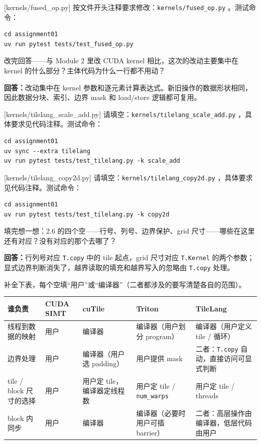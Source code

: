 \documentclass[11pt,a4paper,fontset=windows]{ctexart}
\begin{document}
[kernels/fused\_op.py]
按文件开头注释要求修改：\texttt{kernels/fused\_op.py} 。测试命令：

\begin{lstlisting}
cd assignment01
uv run pytest tests/test_fused_op.py
\end{lstlisting}

改完回答——与 Module 2 里改 CUDA kernel 相比，这次的改动主要集中在 kernel 的什么部分？主体代码为什么一行都不用动？

\par\textbf{回答：}改动集中在 kernel 参数和逐元素计算表达式。新旧操作的数据形状相同，因此数据分块、索引、边界 mask 和 load/store 逻辑都可复用。

[kernels/tilelang\_scale\_add.py]
请填空：\texttt{kernels/tilelang\_scale\_add.py} ，具体要求见代码注释。测试命令：

\begin{lstlisting}
cd assignment01
uv sync --extra tilelang
uv run pytest tests/test_tilelang.py -k scale_add
\end{lstlisting}

[kernels/tilelang\_copy2d.py]
请填空：\texttt{kernels/tilelang\_copy2d.py} ，具体要求见代码注释。测试命令：

\begin{lstlisting}
cd assignment01
uv run pytest tests/test_tilelang.py -k copy2d
\end{lstlisting}

填完想一想：2.6 的四个空——行号、列号、边界保护、grid 尺寸——哪些在这里还有对应？没有对应的那个去哪了？

\par\textbf{回答：}行列号对应 \texttt{T.copy} 中的 tile 起点，grid 尺寸对应 \texttt{T.Kernel} 的两个参数；显式边界判断消失了，越界读取的填充和越界写入的忽略由 \texttt{T.copy} 处理。

补全下表，每个空填“用户”或“编译器”（二者都涉及的要写清楚各自的范围）。

\begin{center}\small
\begin{tabular}{@{}lp{6em}p{8em}p{8em}p{9em}@{}}
\toprule
谁负责 & CUDA SIMT & cuTile & Triton & TileLang \\
\midrule
线程到数据的映射 & 用户 & 编译器 & 编译器（用户划分 program） & 编译器（用户定义 tile / 循环） \\
边界处理 & 用户 & 编译器（用户选 padding） & 用户提供 mask & 二者：\texttt{T.copy} 自动，直接访问可显式判断 \\
tile / block 尺寸的选择 & 用户 & 用户定 tile，编译器定线程数 & 用户定 tile / \texttt{num\_warps} & 用户定 tile / threads \\
block 内同步 & 用户 & 编译器 & 编译器（必要时用户可插 barrier） & 二者：高层操作由编译器，低层代码由用户 \\
\bottomrule
\end{tabular}
\end{center}
\end{document}
